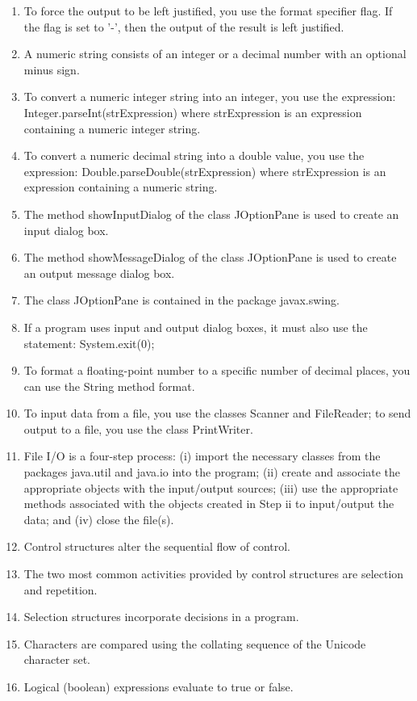 \documentclass[12pt,a4paper,final,twoside,onecolumn,titlepage]{book}
\begin{document}
\begin{enumerate}
\item To force the output to be left justified, you use the format specifier flag. If the flag is set to '-', then the output of the result is left justified.
\item A numeric string consists of an integer or a decimal number with an optional minus sign.
\item To convert a numeric integer string into an integer, you use the expression:
Integer.parseInt(strExpression)
where strExpression is an expression containing a numeric integer string.
\item To convert a numeric decimal string into a double value, you use the
expression:
Double.parseDouble(strExpression)
where strExpression is an expression containing a numeric string.
\item The method showInputDialog of the class JOptionPane is used to create an input dialog box.
\item The method showMessageDialog of the class JOptionPane is used to create an output message dialog box.
\item The class JOptionPane is contained in the package javax.swing.
\item If a program uses input and output dialog boxes, it must also use the statement:
System.exit(0);
\item To format a floating-point number to a specific number of decimal places, you can use the String method format.
\item To input data from a file, you use the classes Scanner and FileReader; to send output to a file, you use the class PrintWriter.
\item File I/O is a four-step process: (i) import the necessary classes from the packages java.util and java.io into the program; (ii) create and associate the appropriate objects with the input/output sources; (iii) use the appropriate methods associated with the objects created in Step ii to input/output the data; and (iv) close the file(s).
\item Control structures alter the sequential flow of control.
\item The two most common activities provided by control structures are selection and repetition.
\item Selection structures incorporate decisions in a program.
\item Characters are compared using the collating sequence of the Unicode character set.
\item Logical (boolean) expressions evaluate to true or false.

\end{enumerate}
\end{document}
